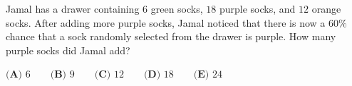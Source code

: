Jamal has a drawer containing $6$ green socks, $18$ purple socks, and $12$ orange socks. After adding more purple socks, Jamal noticed that there is now a $60\%$ chance that a sock randomly selected from the drawer is purple. How many purple socks did Jamal add?

$\textbf{(A) }6 \qquad \textbf{(B) }9 \qquad \textbf{(C) }12 \qquad \textbf{(D) }18 \qquad \textbf{(E) }24$
